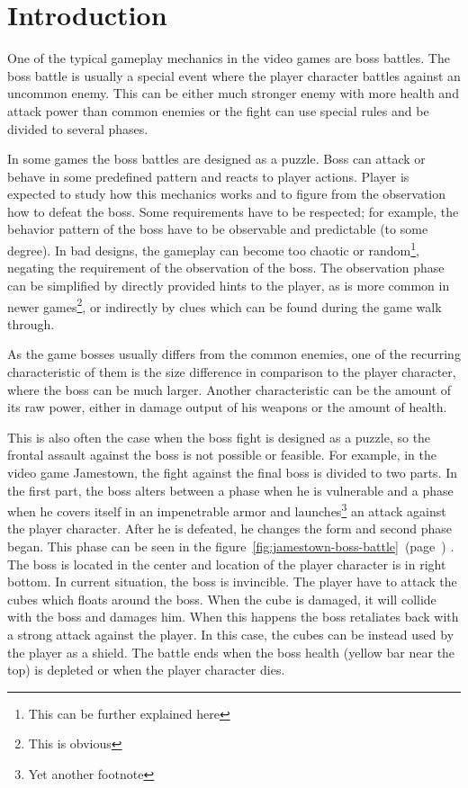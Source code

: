 \documentclass[a4paper]{article}
\newcommand{\reffigure}[1]
{
	figure~\ref{fig:#1}~(page~\pageref{fig:#1})%
}
\begin{document}
\section{Introduction}

One of the typical gameplay mechanics in the video games are boss battles. The boss battle is usually a special event where the player character battles against an uncommon enemy. This can be either much stronger enemy with more health and attack power than common enemies or the fight can use special rules and be divided to several phases.


In some games the boss battles are designed as a puzzle. Boss can attack or behave in some predefined pattern and reacts to player actions. Player is expected to study how this mechanics works and to figure from the observation how to defeat the boss. Some requirements have to be respected; for example, the behavior pattern of the boss have to be observable and predictable (to some degree). In bad designs, the gameplay can become too chaotic or random\footnote{This can be further explained here}, negating the requirement of the observation of the boss. The observation phase can be simplified by directly provided hints to the player, as is more common in newer games\footnote{This is obvious}, or indirectly by clues which can be found during the game walk through.


As the game bosses usually differs from the common enemies, one of the recurring characteristic of them is the size difference in comparison to the player character, where the boss can be much larger. Another characteristic can be the amount of its raw power, either in damage output of his weapons or the amount of health.


This is also often the case when the boss fight is designed as a puzzle, so the frontal assault against the boss is not possible or feasible. For example, in the video game Jamestown, the fight against the final boss is divided to two parts. In the first part, the boss alters between a phase when he is vulnerable and a phase when he covers itself in an impenetrable armor and launches\footnote{Yet another footnote} an attack against the player character. After he is defeated, he changes the form and second phase began. This phase can be seen in the \reffigure{jamestown-boss-battle}. The boss is located in the center and location of the player character is in right bottom. In current situation, the boss is invincible. The player have to attack the cubes which floats around the boss. When the cube is damaged, it will collide with the boss and damages him. When this happens the boss retaliates back with a strong attack against the player. In this case, the cubes can be instead used by the player as a shield. The battle ends when the boss health (yellow bar near the top) is depleted or when the player character dies.
\end{document}
